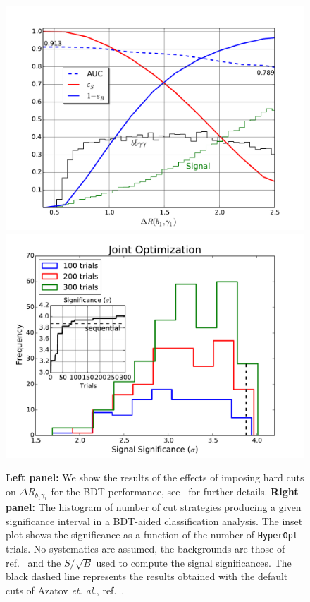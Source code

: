 \begin{figure}[!t]
\centering
\includegraphics[scale=0.35]{./section3/plots/tradeoff_HHH.pdf}
\includegraphics[scale=0.35]{./section3/plots/improve_HHH_joint.pdf}
\caption{\textbf{Left panel:}  We show the results of the effects of imposing hard cuts on $\Delta R_{b_1\gamma_1}$ for the BDT performance, see~\cite{Alves:2017ued} for further details. \textbf{Right panel:} The histogram of number of cut strategies producing a given significance interval in a BDT-aided classification analysis. The inset plot shows the significance as a function of the number of \texttt{HyperOpt} trials. No systematics are assumed, the backgrounds are those of ref.~\cite{Azatov:2015oxa} and the $S/\sqrt{B}$ used to compute the signal significances. The black dashed line represents the results obtained with the default cuts of Azatov \emph{et. al.}, ref.~\cite{Azatov:2015oxa}.}
\label{fig:8resultsKS}
\end{figure}
